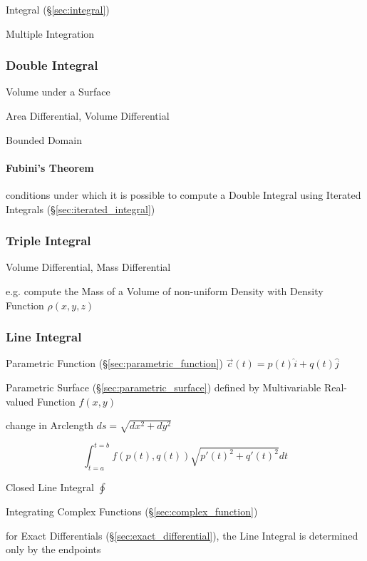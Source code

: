 Integral (\S\ref{sec:integral})

Multiple Integration



\subsubsection{Double Integral}\label{sec:double_integral}

Volume under a Surface

Area Differential, Volume Differential

Bounded Domain



\paragraph{Fubini's Theorem}\label{sec:fubinis_theorem}\hfill

conditions under which it is possible to compute a Double Integral using
Iterated Integrals (\S\ref{sec:iterated_integral})



\subsubsection{Triple Integral}\label{sec:triple_integral}

Volume Differential, Mass Differential

e.g. compute the Mass of a Volume of non-uniform Density with Density Function
$\rho(x,y,z)$



\subsubsection{Line Integral}\label{sec:line_integral}

Parametric Function (\S\ref{sec:parametric_function}) $\vec{c}(t) = p(t)\hat{i}
+ q(t)\hat{j}$

Parametric Surface (\S\ref{sec:parametric_surface}) defined by Multivariable
Real-valued Function $f(x,y)$

change in Arclength $ds = \sqrt{dx^2 + dy^2}$

\[
  \int_{t=a}^{t=b} f(p(t),q(t)) \sqrt{p'(t)^2 + q'(t)^2} dt
\]

Closed Line Integral $\oint$

Integrating Complex Functions (\S\ref{sec:complex_function})

for Exact Differentials (\S\ref{sec:exact_differential}), the Line Integral is
determined only by the endpoints



